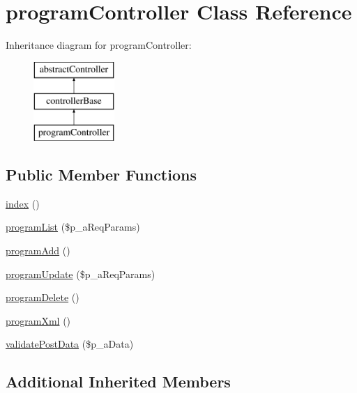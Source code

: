 \hypertarget{classprogram_controller}{\section{program\-Controller Class Reference}
\label{classprogram_controller}
}
Inheritance diagram for program\-Controller\-:\begin{figure}[H]
\begin{center}
\leavevmode
\includegraphics[height=3.000000cm]{classprogram_controller}
\end{center}
\end{figure}
\subsection*{Public Member Functions}
\begin{DoxyCompactItemize}
\item 
\hyperlink{classprogram_controller_a149eb92716c1084a935e04a8d95f7347}{index} ()
\item 
\hyperlink{classprogram_controller_a92fb4a09ef2b90bb7989581130af0570}{program\-List} (\$p\-\_\-a\-Req\-Params)
\item 
\hyperlink{classprogram_controller_ab1b9db62e2662a2ad874b1817123659a}{program\-Add} ()
\item 
\hyperlink{classprogram_controller_a97a2d8b5d4a9f4bb31583bc8cd583bf1}{program\-Update} (\$p\-\_\-a\-Req\-Params)
\item 
\hyperlink{classprogram_controller_af04444cdcd982905cc5cfd23d5845d5c}{program\-Delete} ()
\item 
\hyperlink{classprogram_controller_a81ac253885e630f788e56b308cc5769e}{program\-Xml} ()
\item 
\hyperlink{classprogram_controller_a43993da6cb1ef597d6fbacc778133112}{validate\-Post\-Data} (\$p\-\_\-a\-Data)
\end{DoxyCompactItemize}
\subsection*{Additional Inherited Members}


